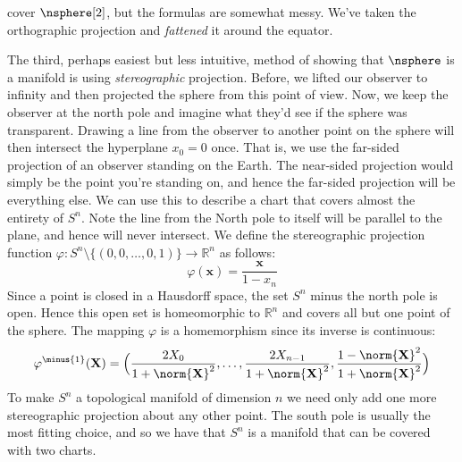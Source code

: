         cover $\nsphere[2]$, but the formulas are somewhat messy. We've taken
        the orthographic projection and \textit{fattened} it around the equator.
        \begin{example}
            The third, perhaps easiest but less intuitive, method of showing
            that $\nsphere$ is a manifold is using \textit{stereographic}
            projection. Before, we lifted our observer to infinity and then
            projected the sphere from this point of view. Now, we keep the
            observer at the north pole and imagine what they'd see if the sphere
            was transparent. Drawing a line from the observer to another point
            on the sphere will then intersect the hyperplane $x_{0}=0$ once.
            That is, we use the far-sided projection of an observer standing on
            the Earth. The near-sided projection would simply be the point
            you're standing on, and hence the far-sided projection will be
            everything else. We can use this to describe a chart that covers
            almost the entirety of $S^{n}$. Note the line from the North pole to
            itself will be parallel to the plane, and hence will never
            intersect. We define the stereographic projection function
            $\varphi:S^{n}\setminus\{(0,0,\dots,0,1)\}\rightarrow\mathbb{R}^{n}$
            as follows:
            \begin{equation}
                \varphi(\mathbf{x})=\frac{\mathbf{x}}{1-x_{n}}
            \end{equation}
            Since a point is closed in a Hausdorff space, the set $S^{n}$ minus
            the north pole is open. Hence this open set is homeomorphic to
            $\mathbb{R}^{n}$ and covers all but one point of the sphere. The
            mapping $\varphi$ is a homemorphism since its inverse is continuous:
            \begin{equation}
                \varphi^{\minus{1}}(\mathbf{X})=\Big(
                    \frac{2X_{0}}{1+\norm{\mathbf{X}}^{2}},\dots,
                    \frac{2X_{n-1}}{1+\norm{\mathbf{X}}^{2}},
                    \frac{1-\norm{\mathbf{X}}^{2}}{1+\norm{\mathbf{X}}^{2}}\Big)
            \end{equation}
            To make $S^{n}$ a topological manifold of dimension $n$ we need only
            add one more stereographic projection about any other point. The
            south pole is usually the most fitting choice, and so we have that
            $S^{n}$ is a manifold that can be covered with two charts.
        \end{example}
